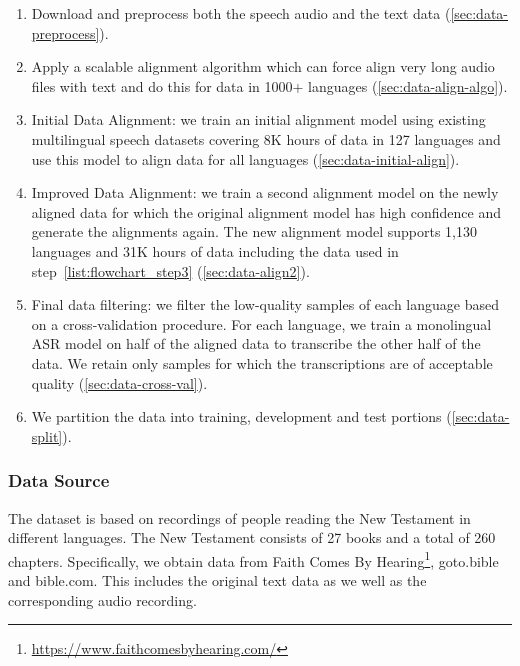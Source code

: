 \begin{enumerate}
    \item Download and preprocess both the speech audio and the text data (\textsection\ref{sec:data-preprocess}). 
    
    \item Apply a scalable alignment algorithm which can force align very long audio files with text and do this for data in 1000+ languages (\textsection\ref{sec:data-align-algo}).

        
    \item Initial Data Alignment: we train an initial alignment model using existing multilingual speech datasets covering 8K hours of data in 127 languages and use this model to align data for all languages 
    (\textsection\ref{sec:data-initial-align}).  \label{list:flowchart_step3}
    
    \item Improved Data Alignment: we train a second alignment model on the newly aligned data for which the original alignment model has high confidence and generate the alignments again. 
    The new alignment model supports 1,130 languages and 31K hours of data including the data used in step~\ref{list:flowchart_step3} (\textsection\ref{sec:data-align2}).

    \item Final data filtering: we filter the low-quality samples of each language based on a cross-validation procedure. 
    For each language, we train a monolingual ASR model on half of the aligned data to transcribe the other half of the data.  
    We retain only samples for which the transcriptions are of acceptable quality (\textsection\ref{sec:data-cross-val}).
    
    \item We partition the data into training, development and test portions (\textsection\ref{sec:data-split}).
\end{enumerate}





\subsubsection{Data Source}
\label{sec:data-paired-source}

The \MMS{} dataset is based on recordings of people reading the New Testament in different languages.
The New Testament consists of 27 books and a total of 260 chapters. 
Specifically, we obtain data from Faith Comes By Hearing\footnote{\url{https://www.faithcomesbyhearing.com/}}, goto.bible and bible.com. 
This includes the original text data as we well as the corresponding audio recording.


